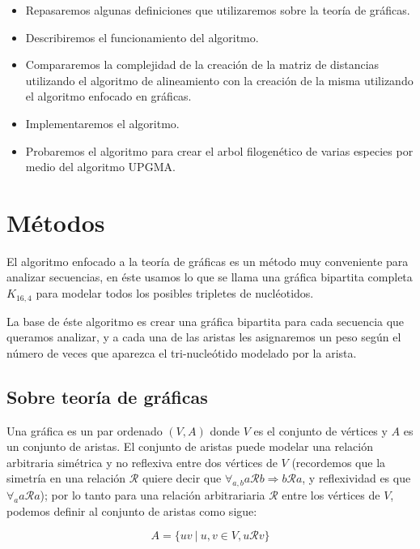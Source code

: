 \documentclass[12pt]{article}
\begin{document}
\begin{itemize}
\item Repasaremos algunas definiciones que utilizaremos sobre la teoría de gráficas.
\item Describiremos el funcionamiento del algoritmo.
\item Compararemos la complejidad de la creación de la matriz de distancias utilizando el algoritmo de alineamiento con la creación de la misma utilizando el algoritmo enfocado en gráficas.
\item Implementaremos el algoritmo.
\item Probaremos el algoritmo para crear el arbol filogenético de varias especies por medio del algoritmo UPGMA.\@
\end{itemize}

\section{Métodos}

\noindent El algoritmo enfocado a la teoría de gráficas es un método muy conveniente para analizar secuencias, en éste usamos lo que se llama una gráfica bipartita completa $K_{16,4}$ para modelar todos los posibles tripletes de nucléotidos.

La base de éste algoritmo es crear una gráfica bipartita para cada secuencia que queramos analizar, y a cada una de las aristas les asignaremos un peso según el número de veces que aparezca el tri-nucleótido modelado por la arista.

\newpage

\subsection{Sobre teoría de gráficas}

\noindent Una gráfica es un par ordenado $(V,A)$ donde $V$ es el conjunto de vértices y $A$ es un conjunto de aristas. El conjunto de aristas puede modelar una relación arbitraria simétrica y no reflexiva entre dos vértices de $V$ (recordemos que la simetría en una relación $\mathcal{R}$ quiere decir que $\forall_{a,b}a\mathcal{R}b\Rightarrow b\mathcal{R}a$, y reflexividad es que $\forall_a a\mathcal{R}a$); por lo tanto para una relación arbitrariaria $\mathcal{R}$ entre los vértices de $V$, podemos definir al conjunto de aristas como sigue:

\[A=\{uv\ |\ u,v\in V, u\mathcal{R}v\}\]
\end{document}
